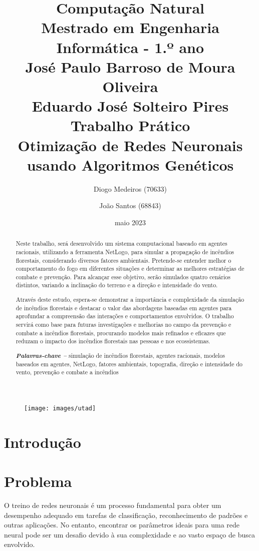 \documentclass[a4paper, portuguese]{report}
\title{{\textbf{Computação Natural}}\\ Mestrado em Engenharia Informática - 1.º ano\\\vspace*{1cm} José Paulo Barroso de Moura Oliveira\\ Eduardo José Solteiro Pires\\\vspace*{3cm}\textbf{Trabalho Prático}\\\vspace*{0.5cm} Otimização de Redes Neuronais usando Algoritmos Genéticos \vspace*{1cm}}
\author{Diogo Medeiros (70633) \and João Santos (68843)}
\date{maio 2023}
\providecommand{\keywords}[1]
{
    \small
    \textbf{\textit{Palavras-chave --}} #1
}
\begin{document}
    \begin{figure}
        \texttt{[image: images/utad]}
        \label{fig:utad_logo}
    \end{figure}
    \maketitle
    \begin{abstract}

        Neste trabalho, será desenvolvido um sistema computacional baseado em agentes racionais, utilizando a ferramenta NetLogo, para simular a propagação de incêndios florestais, considerando diversos fatores ambientais.
        Pretende-se entender melhor o comportamento do fogo em diferentes situações e determinar as melhores estratégias de combate e prevenção.
        Para alcançar esse objetivo, serão simulados quatro cenários distintos, variando a inclinação do terreno e a direção e intensidade do vento.

        Através deste estudo, espera-se demonstrar a importância e complexidade da simulação de incêndios florestais e destacar o valor das abordagens baseadas em agentes para aprofundar a compreensão das interações e comportamentos envolvidos.
        O trabalho servirá como base para futuras investigações e melhorias no campo da prevenção e combate a incêndios florestais, procurando modelos mais refinados e eficazes que reduzam o impacto dos incêndios florestais nas pessoas e nos ecossistemas.

        \keywords{simulação de incêndios florestais, agentes racionais, modelos baseados em agentes, NetLogo, fatores ambientais, topografia, direção e intensidade do vento, prevenção e combate a incêndios}

    \end{abstract}
    \tableofcontents
    \listoffigures
    \listoftables
    \listofalgorithms


    \chapter{Introdução}\label{ch:introduction}
    


    \chapter{Problema}\label{ch:problem}

    O treino de redes neuronais é um processo fundamental para obter um desempenho adequado em tarefas de classificação, reconhecimento de padrões e outras aplicações.
    No entanto, encontrar os parâmetros ideais para uma rede neural pode ser um desafio devido à sua complexidade e ao vasto espaço de busca envolvido.
\end{document}
